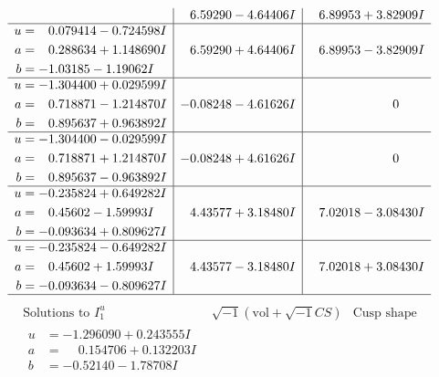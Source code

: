 \documentclass[1p]{elsarticle_modified}
\theoremstyle{definition}
\newcommand{\I}{\sqrt{-1}}
\begin{document}
$$\begin{array}{c|c|c}
 & \phantom{-}6.59290 - 4.64406 I & \phantom{-}6.89953 + 3.82909 I \\ \hline\begin{aligned}
u &= \phantom{-}0.079414 - 0.724598 I \\
a &= \phantom{-}0.288634 + 1.148690 I \\
b &= -1.03185 - 1.19062 I\end{aligned}
 & \phantom{-}6.59290 + 4.64406 I & \phantom{-}6.89953 - 3.82909 I \\ \hline\begin{aligned}
u &= -1.304400 + 0.029599 I \\
a &= \phantom{-}0.718871 - 1.214870 I \\
b &= \phantom{-}0.895637 + 0.963892 I\end{aligned}
 & -0.08248 - 4.61626 I & \phantom{-0.000000 } 0 \\ \hline\begin{aligned}
u &= -1.304400 - 0.029599 I \\
a &= \phantom{-}0.718871 + 1.214870 I \\
b &= \phantom{-}0.895637 - 0.963892 I\end{aligned}
 & -0.08248 + 4.61626 I & \phantom{-0.000000 } 0 \\ \hline\begin{aligned}
u &= -0.235824 + 0.649282 I \\
a &= \phantom{-}0.45602 - 1.59993 I \\
b &= -0.093634 + 0.809627 I\end{aligned}
 & \phantom{-}4.43577 + 3.18480 I & \phantom{-}7.02018 - 3.08430 I \\ \hline\begin{aligned}
u &= -0.235824 - 0.649282 I \\
a &= \phantom{-}0.45602 + 1.59993 I \\
b &= -0.093634 - 0.809627 I\end{aligned}
 & \phantom{-}4.43577 - 3.18480 I & \phantom{-}7.02018 + 3.08430 I\\
 \hline 
 \end{array}$$\newpage$$\begin{array}{c|c|c}  
\text{Solutions to }I^u_{1}& \I (\text{vol} + \sqrt{-1}CS) & \text{Cusp shape}\\
 \hline 
\begin{aligned}
u &= -1.296090 + 0.243555 I \\
a &= \phantom{-}0.154706 + 0.132203 I \\
b &= -0.52140 - 1.78708 I\end{aligned}

\end{array}$$
\end{document}
